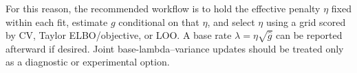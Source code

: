 \documentclass[11pt]{article}
\begin{document}
For this reason, the recommended workflow is to hold the effective penalty
$\eta$ fixed within each fit, estimate $g$ conditional on that $\eta$, and
select $\eta$ using a grid scored by CV, Taylor ELBO/objective, or LOO.  A base
rate $\lambda=\eta\sqrt{\hat g}$ can be reported afterward if desired.  Joint
base-lambda--variance updates should be treated only as a diagnostic or
experimental option.
\end{document}
